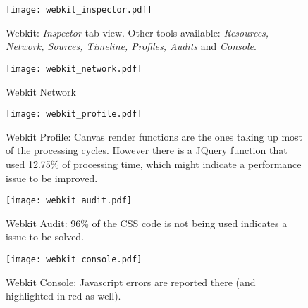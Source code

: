       \begin{figure}[ht]
        \begin{center}
          \texttt{[image: webkit\_inspector.pdf]}
        \end{center}
        \caption{Webkit: \emph{Inspector} tab view. Other tools available: \emph{Resources, Network, Sources, Timeline, Profiles, Audits} and \emph{Console}.}
        \label{fig:webkit_inspector}
      \end{figure}

      \begin{figure}[ht]
        \begin{center}
          \texttt{[image: webkit\_network.pdf]}
        \end{center}
        \caption{Webkit Network}
        \label{fig:webkit_network}
      \end{figure}

      \begin{figure}[ht]
        \begin{center}
          \texttt{[image: webkit\_profile.pdf]}
        \end{center}
        \caption{Webkit Profile: Canvas render functions are the ones taking up most of the processing cycles. However there is a JQuery function that used 12.75\% of processing time, which might indicate a performance issue to be improved.}
        \label{fig:webkit_profile}
      \end{figure}

      \begin{figure}[ht]
        \begin{center}
          \texttt{[image: webkit\_audit.pdf]}
        \end{center}
        \caption{Webkit Audit: 96\% of the CSS code is not being used indicates a issue to be solved.}
        \label{fig:webkit_audit}
      \end{figure}

      \begin{figure}[ht]
        \begin{center}
          \texttt{[image: webkit\_console.pdf]}
        \end{center}
        \caption{Webkit Console: Javascript errors are reported there (and highlighted in red as well).}
        \label{fig:webkit_console}
      \end{figure}

      \clearpage

